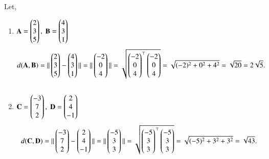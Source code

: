 \documentclass[journal,12pt,onecolumn]{IEEEtran}
\begin{document}
Let,
\begin{enumerate}
\item $\mathbf{A} = \begin{pmatrix}2\\3\\5\end{pmatrix}, \;\mathbf{B} = \begin{pmatrix}4\\3\\1\end{pmatrix}$
\begin{align*}
d(\mathbf{A},\mathbf{B}) &= \|\begin{pmatrix}2\\3\\5\end{pmatrix}-\begin{pmatrix}4\\3\\1\end{pmatrix}\|
= \|\begin{pmatrix}-2\\0\\4\end{pmatrix}\| = \sqrt{\begin{pmatrix}-2\\0\\4\end{pmatrix}^\top\begin{pmatrix}-2\\0\\4\end{pmatrix}} = \sqrt{(-2)^2+0^2+4^2} = \sqrt{20} = 2\sqrt{5}. \\[10pt]
\end{align*}

\item $\mathbf{C} = \begin{pmatrix}-3\\7\\2\end{pmatrix}, \;\mathbf{D} = \begin{pmatrix}2\\4\\-1\end{pmatrix}$
\begin{align*}
d(\mathbf{C},\mathbf{D}) &= \|\begin{pmatrix}-3\\7\\2\end{pmatrix}-\begin{pmatrix}2\\4\\-1\end{pmatrix}\|
= \|\begin{pmatrix}-5\\3\\3\end{pmatrix}\| = \sqrt{\begin{pmatrix}-5\\3\\3\end{pmatrix}^\top\begin{pmatrix}-5\\3\\3\end{pmatrix}} = \sqrt{(-5)^2+3^2+3^2} = \sqrt{43}. \\[10pt]
\end{align*}


\end{enumerate}
\end{document}
